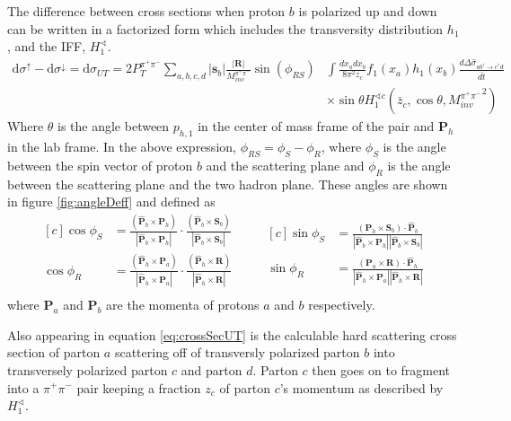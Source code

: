 \documentclass[abstract = on,listof=totoc, bibliography=totoc]{scrreprt}
\newcommand{\phir}{\phi_{R}}
\newcommand{\phis}{\phi_{S}}
\newcommand{\phirs}{\phi_{RS}}
\newcommand{\ptpair}{P_{T}^{\pi^+\pi^-}}
\newcommand{\mpair}{M_{inv}^{\pi^+\pi^-}}
\newcommand{\pip}{\pi^+}
\newcommand{\pim}{\pi^-}
\newcommand{\pair}{$\pip\pim$ }
\begin{document}
The difference between cross sections when proton $b$ is polarized up and down can be written in a factorized form which includes the transversity distribution $h_1$, and the IFF, $H_1^{\sphericalangle}$.
\begin{align}
\label{eq:crossSecUT}
\text{d}\sigma^\uparrow - \text{d}\sigma^\downarrow = \text{d}\sigma_{UT} = 2\ptpair \sum_{a,b,c,d} |\boldsymbol{s}_b| \frac{|\boldsymbol{R}|}{\mpair}\sin(\phirs) & \int \frac{dx_a dx_b}{8\pi^2 z_c} f_1(x_a) h_1(x_b) \frac{d\Delta\hat{\sigma}_{a b^\uparrow \rightarrow c^\uparrow d}}{d\hat{t}} \nonumber \\ 
&\times \sin\theta H_1^{\sphericalangle c} \left(\bar{z}_c,\cos\theta, {\mpair}^2\right) 
\end{align}
Where $\theta$ is the angle between $p_{h,1}$ in the center of mass frame of the pair and $\bm{P}_h$ in the lab frame. In the above expression, $\phirs = \phis-\phir$, where $\phis$ is the angle between the spin vector of proton $b$ and the scattering plane and $\phir$ is the angle between the scattering plane and the two hadron plane. These angles are shown in figure \ref{fig:angleDeff} and defined as \cite{bacchettaRadici2}
\begin{equation}
\label{eq:angles}
\begin{aligned}[c]
\cos\phi_S &= \frac{(\bm{\hat{P}}_b \times \bm{P}_h)}{|\bm{\hat{P}}_b \times \bm{P}_h|} \cdot \frac{(\bm{\hat{P}}_b \times \bm{S}_b)}{|\bm{\hat{P}}_b \times \bm{S}_b|} \\
\cos\phi_R &= \frac{(\bm{\hat{P}}_h \times \bm{P}_a)}{|\bm{\hat{P}}_h \times \bm{P}_a|} \cdot \frac{(\bm{\hat{P}}_h \times \bm{R})}{|\bm{\hat{P}}_h \times \bm{R}|} \\
\end{aligned}
\qquad
\begin{aligned}[c]
\sin\phi_S &= \frac{(\bm{P}_h \times \bm{S}_b) \cdot \bm{\hat{P}}_b}{|\bm{\hat{P}}_b \times \bm{P}_h| |\bm{\hat{P}}_b \times \bm{S}_b|} \\
\sin\phi_R &= \frac{(\bm{P}_a \times \bm{R}) \cdot \bm{\hat{P}}_h}{|\bm{\hat{P}}_h \times \bm{P}_a| |\bm{\hat{P}}_h \times \bm{R}|} 
\end{aligned}
\end{equation}
where $\bm{P}_a$ and $\bm{P}_b$ are the momenta of protons $a$ and $b$ respectively.

Also appearing in equation \ref{eq:crossSecUT} is the calculable hard scattering cross section of parton $a$ scattering off of transversly polarized parton $b$ into transversely polarized parton $c$ and parton $d$. Parton $c$ then goes on to fragment into a \pair pair keeping a fraction $z_c$ of parton $c$'s momentum as described by $H_1^{\sphericalangle}$.
\end{document}

